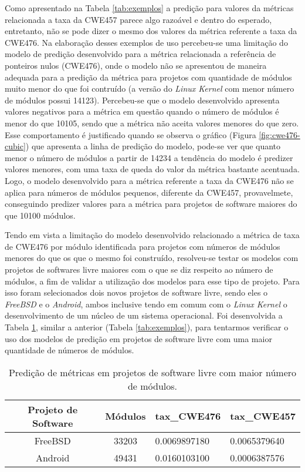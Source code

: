Como apresentado na Tabela \ref{tab:exemplos} a predição para valores da
métricas relacionada a taxa da CWE457 parece algo razoável e dentro do esperado,
entretanto, não se pode dizer o mesmo dos valores da métrica referente a taxa da
CWE476. Na elaboração desses exemplos de uso percebeu-se uma limitação do
modelo de predição desenvolvido para a métrica relacionada a referência de
ponteiros nulos (CWE476), onde o modelo não se apresentou de maneira adequada
para a predição da métrica para projetos com quantidade de módulos muito menor
do que foi contruído (a versão do \textit{Linux Kernel} com menor número de
módulos possui 14123). Percebeu-se que o modelo desenvolvido apresenta valores
negativos para a métrica em questão quando o número de módulos é menor do que
10105, sendo que a métrica não aceita valores menores do que zero. Esse
comportamento é justificado quando se observa o gráfico (Figura
\ref{fig:cwe476-cubic}) que apresenta a linha de predição do modelo, pode-se ver
que quanto menor o número de módulos a partir de 14234 a tendência do modelo é
predizer valores menores, com uma taxa de queda do valor da métrica bastante
acentuada. Logo, o modelo desenvolvido para a métrica referente a taxa da CWE476
não se aplica para números de módulos pequenos, diferente da CWE457,
provavelmete, conseguindo predizer valores para a métrica para projetos de
software maiores do que 10100 módulos.

Tendo em vista a limitação do modelo desenvolvido relacionado a métrica de taxa
de CWE476 por módulo identificada para projetos com números de módulos menores
do que os que o mesmo foi construído, resolveu-se testar os modelos com projetos
de softwares livre maiores com o que se diz respeito ao número de módulos, a fim
de validar a utilização dos modelos para esse tipo de projeto. Para isso foram
selecionados dois novos projetos de software livre, sendo eles o
\textit{FreeBSD} e o \textit{Android}, ambos inclusive tendo em comum com o
\textit{Linux Kernel} o desenvolvimento de um núcleo de um sistema operacional.
Foi desenvolvida a Tabela \ref{tab:exemplos2}, similar a anterior (Tabela
\ref{tab:exemplos}), para tentarmos verificar o uso dos modelos de predição em
projetos de software livre com uma maior quantidade de números de módulos.

\begin{table}[h]
 \centering
 \begin{tabular}{ccll}
  \hline
  \rowcolor[HTML]{EFEFEF} 
  Projeto de Software & Módulos &
  \multicolumn{1}{c}{\cellcolor[HTML]{EFEFEF}tax\_CWE476} &
  \multicolumn{1}{c}{\cellcolor[HTML]{EFEFEF}tax\_CWE457} \\ \hline
  FreeBSD             & 33203   & 0.0069897180
  & 0.0065379640                                           \\ \hline
  Android             & 49431   & 0.0160103100
  & 0.0006387576                                          \\ \hline
 \end{tabular}
 \caption{Predição de métricas em projetos de software livre com maior número
 de módulos.}
 \label{tab:exemplos2}
\end{table}

